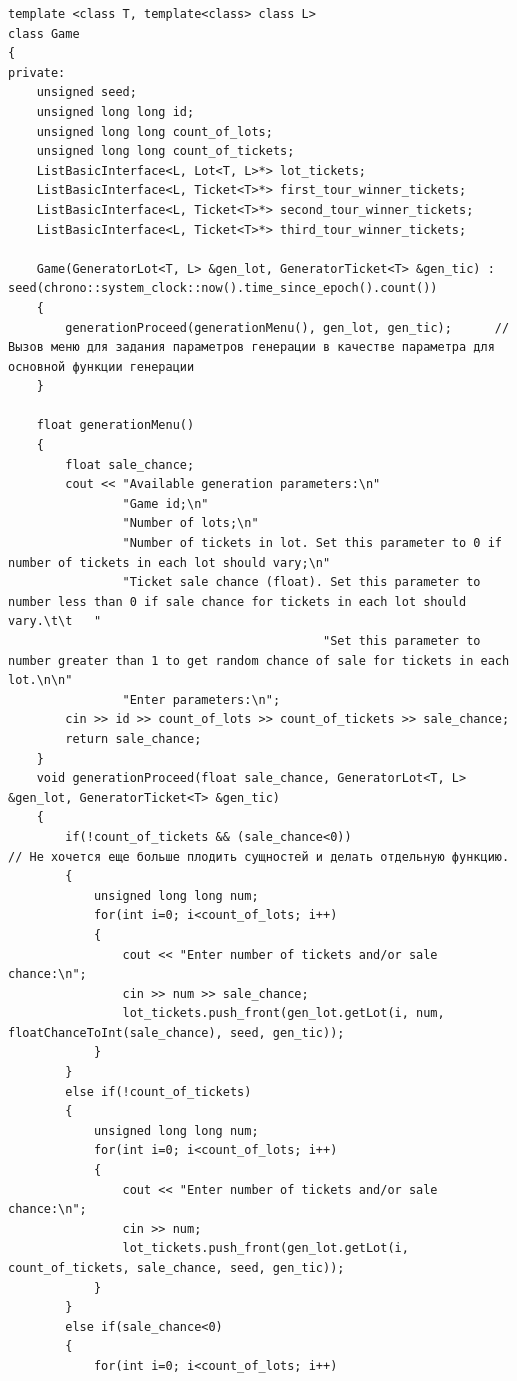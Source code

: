 \documentclass[a4paper,14pt]{article}
\begin{document}
\begin{verbatim}
template <class T, template<class> class L>
class Game
{
private:
    unsigned seed;
    unsigned long long id;
    unsigned long long count_of_lots;
    unsigned long long count_of_tickets;
    ListBasicInterface<L, Lot<T, L>*> lot_tickets;
    ListBasicInterface<L, Ticket<T>*> first_tour_winner_tickets;
    ListBasicInterface<L, Ticket<T>*> second_tour_winner_tickets;
    ListBasicInterface<L, Ticket<T>*> third_tour_winner_tickets;

    Game(GeneratorLot<T, L> &gen_lot, GeneratorTicket<T> &gen_tic) : seed(chrono::system_clock::now().time_since_epoch().count())
    {
        generationProceed(generationMenu(), gen_lot, gen_tic);      // Вызов меню для задания параметров генерации в качестве параметра для основной функции генерации
    }

    float generationMenu()
    {
        float sale_chance;
        cout << "Available generation parameters:\n"
                "Game id;\n"
                "Number of lots;\n"
                "Number of tickets in lot. Set this parameter to 0 if number of tickets in each lot should vary;\n"
                "Ticket sale chance (float). Set this parameter to number less than 0 if sale chance for tickets in each lot should vary.\t\t   "
                                            "Set this parameter to number greater than 1 to get random chance of sale for tickets in each lot.\n\n"
                "Enter parameters:\n";
        cin >> id >> count_of_lots >> count_of_tickets >> sale_chance;
        return sale_chance;
    }
    void generationProceed(float sale_chance, GeneratorLot<T, L> &gen_lot, GeneratorTicket<T> &gen_tic)
    {
        if(!count_of_tickets && (sale_chance<0))                                // Не хочется еще больше плодить сущностей и делать отдельную функцию.
        {
            unsigned long long num;
            for(int i=0; i<count_of_lots; i++)
            {
                cout << "Enter number of tickets and/or sale chance:\n";
                cin >> num >> sale_chance;
                lot_tickets.push_front(gen_lot.getLot(i, num, floatChanceToInt(sale_chance), seed, gen_tic));
            }
        }
        else if(!count_of_tickets)
        {
            unsigned long long num;
            for(int i=0; i<count_of_lots; i++)
            {
                cout << "Enter number of tickets and/or sale chance:\n";
                cin >> num;
                lot_tickets.push_front(gen_lot.getLot(i, count_of_tickets, sale_chance, seed, gen_tic));
            }
        }
        else if(sale_chance<0)
        {
            for(int i=0; i<count_of_lots; i++)

\end{verbatim}
\end{document}
